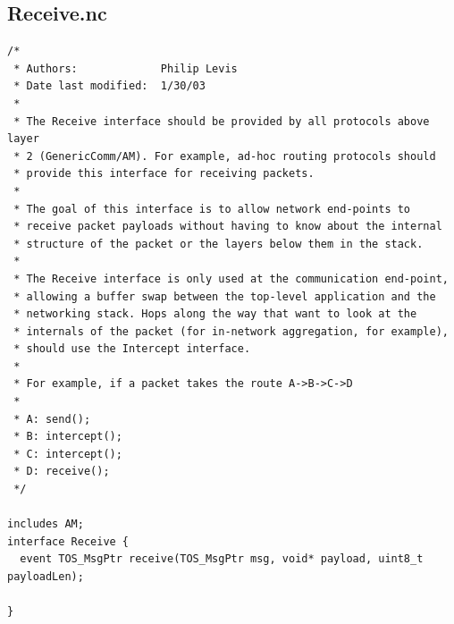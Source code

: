 \documentclass[10pt]{article}
\begin{document}
\subsection*{Receive.nc}
\scriptsize
\begin{verbatim}
/*
 * Authors:             Philip Levis
 * Date last modified:  1/30/03
 *
 * The Receive interface should be provided by all protocols above layer
 * 2 (GenericComm/AM). For example, ad-hoc routing protocols should
 * provide this interface for receiving packets.
 *
 * The goal of this interface is to allow network end-points to
 * receive packet payloads without having to know about the internal
 * structure of the packet or the layers below them in the stack.
 *
 * The Receive interface is only used at the communication end-point,
 * allowing a buffer swap between the top-level application and the
 * networking stack. Hops along the way that want to look at the
 * internals of the packet (for in-network aggregation, for example),
 * should use the Intercept interface.
 *
 * For example, if a packet takes the route A->B->C->D
 *
 * A: send();
 * B: intercept();
 * C: intercept();
 * D: receive();
 */

includes AM;
interface Receive {
  event TOS_MsgPtr receive(TOS_MsgPtr msg, void* payload, uint8_t payloadLen);
  
}

\end{verbatim}
\normalsize
\end{document}
